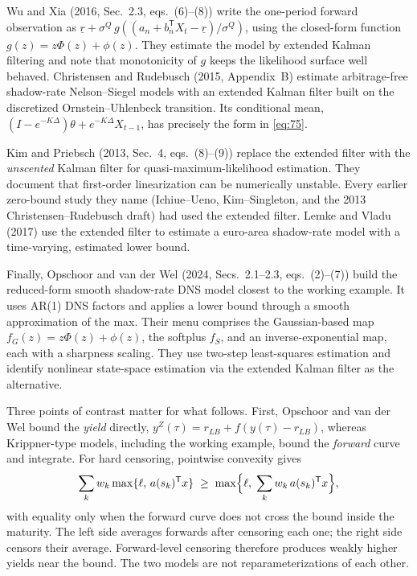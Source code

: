 \documentclass[11pt]{article}
\begin{document}
Wu and Xia (2016, Sec.~2.3, eqs.~(6)--(8)) write the one-period forward observation as
\(\underline r+\sigma^Q\,g\!\left((a_n+b_n^{\mathsf T}X_t-\underline r)/
\sigma^Q\right)\), using the closed-form function \(g(z)=z\Phi(z)+\phi(z)\). They estimate the model by extended Kalman filtering and note that monotonicity of \(g\) keeps the likelihood surface well behaved. Christensen and Rudebusch (2015, Appendix~B) estimate arbitrage-free shadow-rate Nelson--Siegel models with an extended Kalman filter built on the discretized Ornstein--Uhlenbeck transition. Its conditional mean,
\((I-e^{-K\Delta})\theta+e^{-K\Delta}X_{t-1}\), has precisely the form in \eqref{eq:75}.

Kim and Priebsch (2013, Sec.~4, eqs.~(8)--(9)) replace the extended filter with the \emph{unscented} Kalman filter for quasi-maximum-likelihood estimation. They document that first-order linearization can be numerically unstable. Every earlier zero-bound study they name (Ichiue--Ueno, Kim--Singleton, and the 2013 Christensen--Rudebusch draft) had used the extended filter. Lemke and Vladu (2017) use the extended filter to estimate a euro-area shadow-rate model with a time-varying, estimated lower bound.

Finally, Opschoor and van der Wel (2024, Secs.~2.1--2.3, eqs.~(2)--(7)) build the reduced-form smooth shadow-rate DNS model closest to the working example. It uses AR(1) DNS factors and applies a lower bound through a smooth approximation of the max. Their menu comprises the Gaussian-based map
\(f_G(z)=z\Phi(z)+\phi(z)\), the softplus \(f_S\), and an inverse-exponential map, each with a sharpness scaling. They use two-step least-squares estimation and identify nonlinear state-space estimation via the extended Kalman filter as the alternative.

Three points of contrast matter for what follows. First, Opschoor and van der Wel bound the \emph{yield} directly,
\(y^Z(\tau)=r_{LB}+f(y(\tau)-r_{LB})\), whereas Krippner-type models, including the working example, bound the \emph{forward} curve and integrate. For hard censoring, pointwise convexity gives
\begin{equation}\label{eq:80}
 \sum_{k}w_k\max\{\ell,\,a(s_k)^{\mathsf T}x\}
 \;\geq\;
 \max\Bigl\{\ell,\;\sum_{k}w_k\,a(s_k)^{\mathsf T}x\Bigr\},
\end{equation}
with equality only when the forward curve does not cross the bound inside the maturity. The left side averages forwards after censoring each one; the right side censors their average. Forward-level censoring therefore produces weakly higher yields near the bound. The two models are not reparameterizations of each other.
\end{document}
